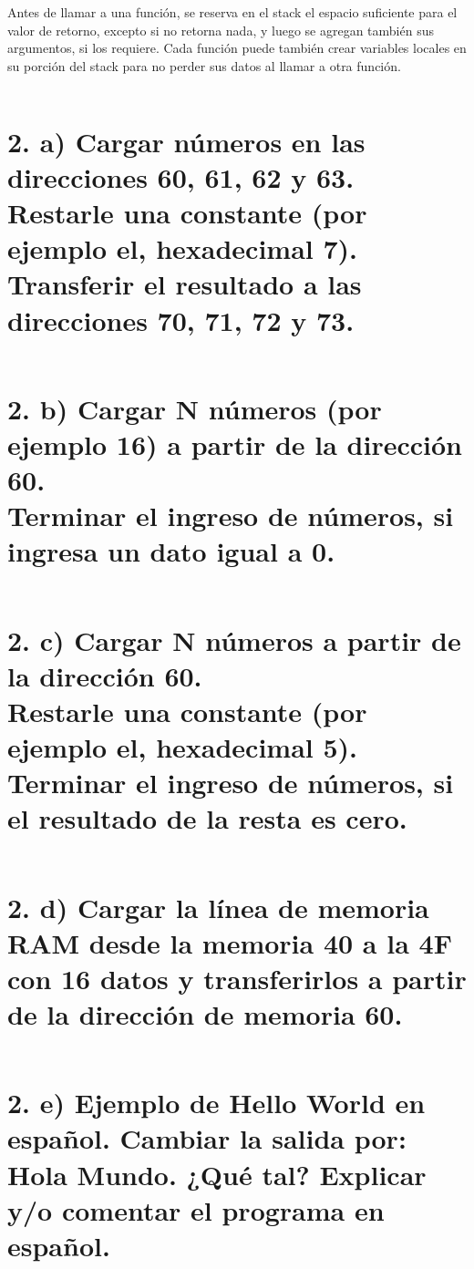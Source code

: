 \documentclass{article}
\begin{document}
Antes de llamar a una función, se reserva en el stack el espacio suficiente para el valor de retorno, excepto si no retorna nada, y luego se agregan también sus argumentos, si los requiere. Cada función puede también crear variables locales en su porción del stack para no perder sus datos al llamar a otra función.

\inputminted{nasm}{./code/1e.txt}

\section*{  2. a) Cargar números en las direcciones 60, 61, 62 y 63.\\
            Restarle una constante (por ejemplo el, hexadecimal 7).\\
            Transferir el resultado a las direcciones 70, 71, 72 y 73.}

\inputminted{nasm}{./code/2a.txt}

\section*{  2. b) Cargar N números (por ejemplo 16) a partir de la dirección 60.\\
            Terminar el ingreso de números, si ingresa un dato igual a 0.}

\inputminted{nasm}{./code/2b.txt}

\section*{  2. c) Cargar N números a partir de la dirección 60.\\
            Restarle una constante (por ejemplo el, hexadecimal 5).\\
            Terminar el ingreso de números, si el resultado de la resta es cero.}

\inputminted{nasm}{./code/2c.txt}

\section*{  2. d) Cargar la línea de memoria RAM desde la memoria 40 a la 4F con 16 datos y transferirlos a partir de la dirección de memoria 60.}

\inputminted{nasm}{./code/2d.txt}

\section*{  2. e) Ejemplo de Hello World en español. Cambiar la salida por: Hola Mundo. ¿Qué tal? Explicar y/o comentar el programa en español.}

\inputminted{nasm}{./code/2e.txt}
\end{document}
